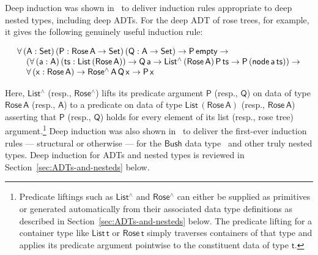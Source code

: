 \documentclass[9pt]{entcs}
\begin{document}
Deep induction was shown in~\cite{jp20} to deliver induction rules
appropriate to deep nested types, including deep ADTs.  For the deep
ADT of rose trees, for example, it gives the following genuinely
useful induction rule:

\vspace*{-0.075in}

\begin{equation}\label{eq:rose}
\begin{array}{l}
\mathsf{\forall \,(A : Set)\,(P : Rose\,A \to Set)\,(Q : A \to Set)
  \to P\,empty \to}\\ 
\mathsf{\hspace*{0.15in}(\forall \,(a : A)\, (ts :
  List\,(Rose\,A))\to Q\,a \to List^\land\,(Rose\,A)\, P\,ts \to P\,(node\,a\,ts)) \to}\\
\mathsf{\hspace*{0.15in}\forall \,(x :
  Rose\,A) \to Rose^\land\,A\,Q\, x \to P\,x} 
\end{array}
\end{equation}

\noindent
Here, $\mathsf{List^\land}$ (resp., $\mathsf{Rose^\land}$) lifts its
predicate argument $\mathsf{P}$ (resp., $\mathsf{Q}$) on data of type
$\mathsf{Rose\,A}$ (resp., $\mathsf{A}$) to a predicate on data of
type $\mathsf{List\,(Rose\,A)}$ (resp., $\mathsf{Rose\,A}$) asserting
that $\mathsf{P}$ (resp., $\mathsf{Q}$) holds for every element of its
list (resp., rose tree) argument.\footnote{Predicate liftings such as
  $\mathsf{List^\land}$ and $\mathsf{Rose^\land}$ can either be
  supplied as primitives or generated automatically from their
  associated data type definitions as described in
  Section~\ref{sec:ADTs-and-nesteds} below. The predicate lifting for
  a container type like $\mathsf{List\,t}$ or $\mathsf{Rose\,t}$
  simply traverses containers of that type and applies its predicate
  argument pointwise to the constituent data of type $\mathsf{t}$.}
Deep induction was also shown in~\cite{jp20} to
deliver the first-ever induction rules --- structural or otherwise ---
for the $\mathsf{Bush}$ data type~\cite{bm98} and other truly nested
types. Deep induction for ADTs and nested types is reviewed in
Section~\ref{sec:ADTs-and-nesteds} below.
\end{document}
